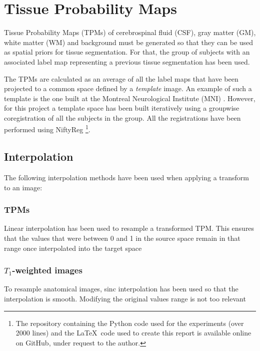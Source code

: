 \section{Tissue Probability Maps}



Tissue Probability Maps (TPMs) of cerebrospinal fluid (CSF), gray matter (GM), white matter (WM) and background must be generated so that they can be used as spatial priors for tissue segmentation. For that, the group of subjects with an associated label map representing a previous tissue segmentation has been used.


The TPMs are calculated as an average of all the label maps that have been projected to a common space defined by a \textit{template} image. An example of such a template is the one built at the Montreal Neurological Institute (MNI) \cite{evans_3d_1993}. However, for this project a template space has been built iteratively using a groupwise coregistration of all the subjects in the group. All the registrations have been performed using NiftyReg \cite{modat_global_2014}\footnote{The repository containing the Python code used for the experiments (over 2000 lines) and the \LaTeX\ code used to create this report is available online on GitHub, under request to the author.}.


\subsection{Interpolation}
The following interpolation methods have been used when applying a transform to an image:

\subsubsection{TPMs}
Linear interpolation has been used to resample a transformed TPM. This ensures that the values that were between 0 and 1 in the source space remain in that range once interpolated into the target space

\subsubsection{$T_1$-weighted images} To resample anatomical images, sinc interpolation has been used so that the interpolation is smooth. Modifying the original values range is not too relevant

